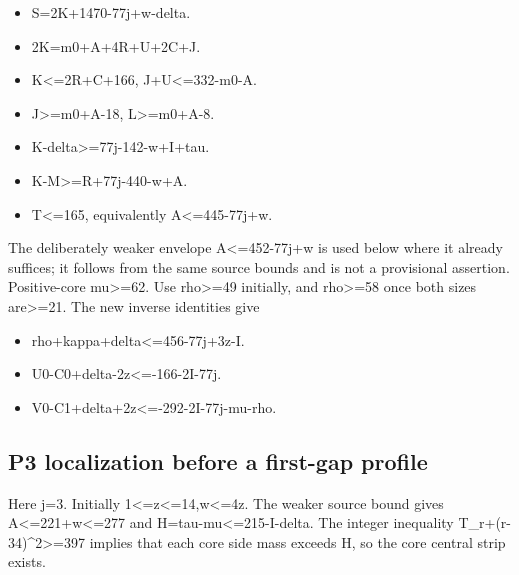 \documentclass[10pt,a4paper]{article}
\theoremstyle{definition}
\providecommand{\tightlist}{\setlength{\itemsep}{0pt}\setlength{\parskip}{0pt}}
\begin{document}
\begin{itemize}
\tightlist
\item
  S=\allowbreak{}2K+\allowbreak{}1470-77j+\allowbreak{}w-delta.
\item
  2K=\allowbreak{}m0+\allowbreak{}A+\allowbreak{}4R+\allowbreak{}U+\allowbreak{}2C+\allowbreak{}J.
\item
  K\textless=\allowbreak{}2R+\allowbreak{}C+\allowbreak{}166,\allowbreak{} J+\allowbreak{}U\textless=\allowbreak{}332-m0-A.
\item
  J\textgreater=\allowbreak{}m0+\allowbreak{}A-18,\allowbreak{} L\textgreater=\allowbreak{}m0+\allowbreak{}A-8.
\item
  K-delta\textgreater=\allowbreak{}77j-142-w+\allowbreak{}I+\allowbreak{}tau.
\item
  K-M\textgreater=\allowbreak{}R+\allowbreak{}77j-440-w+\allowbreak{}A.
\item
  T\textless=\allowbreak{}165,\allowbreak{} equivalently A\textless=\allowbreak{}445-77j+\allowbreak{}w.
\end{itemize}

The deliberately weaker envelope A\textless=\allowbreak{}452-77j+\allowbreak{}w is used below
where it already suffices; it follows from the same source bounds and is
not a provisional assertion. Positive-core mu\textgreater=\allowbreak{}62. Use
rho\textgreater=\allowbreak{}49 initially,\allowbreak{} and rho\textgreater=\allowbreak{}58 once both sizes
are\textgreater=\allowbreak{}21. The new inverse identities give

\begin{itemize}
\tightlist
\item
  rho+\allowbreak{}kappa+\allowbreak{}delta\textless=\allowbreak{}456-77j+\allowbreak{}3z-I.
\item
  U0-C0+\allowbreak{}delta-2z\textless=\allowbreak{}-166-2I-77j.
\item
  V0-C1+\allowbreak{}delta+\allowbreak{}2z\textless=\allowbreak{}-292-2I-77j-mu-rho.
\end{itemize}

\hypertarget{p3-localization-before-a-first-gap-profile}{%
\subsection{P3 localization before a first-gap
profile}\label{p3-localization-before-a-first-gap-profile}}

Here j=\allowbreak{}3. Initially 1\textless=\allowbreak{}z\textless=\allowbreak{}14,\allowbreak{}w\textless=\allowbreak{}4z. The weaker
source bound gives A\textless=\allowbreak{}221+\allowbreak{}w\textless=\allowbreak{}277 and
H=\allowbreak{}tau-mu\textless=\allowbreak{}215-I-delta. The integer inequality
T\_\allowbreak{}r+\allowbreak{}(r-34)\^{}2\textgreater=\allowbreak{}397 implies that each core side mass
exceeds H,\allowbreak{} so the core central strip exists.
\end{document}

